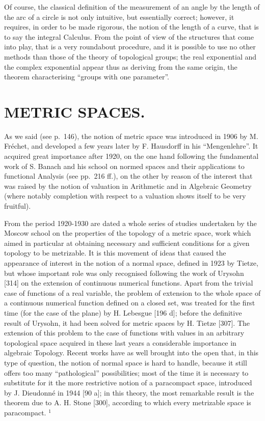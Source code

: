 Of course, the classical definition of the measurement of an angle by the length of the arc of a circle is not only intuitive, but essentially correct; however, it requires, in order to be made rigorous, the notion of the length of a curve, that is to say the integral Calculus. From the point of view of the structures that come into play, that is a very roundabout procedure, and it is possible to use no other methods than those of the theory of topological groups; the real exponential and the complex exponential appear thus as deriving from the same origin, the theorem characterising ``groups with one parameter''.

\chapter{METRIC SPACES.}

As we said (see p.~146), the notion of metric space was introduced in 1906 by M. Fréchet, and developed a few years later by F. Hausdorff in his ``Mengenlehre''. It acquired great importance after 1920, on the one hand following the fundamental work of S. Banach and his school on normed spaces and their applications to functional Analysis (see pp.~216 ff.), on the other by reason of the interest that was raised by the notion of valuation in Arithmetic and in Algebraic Geometry (where notably completion with respect to a valuation shows itself to be very fruitful).

From the period 1920-1930 are dated a whole series of studies undertaken by the Moscow school on the properties of the topology of a metric space, work which aimed in particular at obtaining necessary and sufficient conditions for a given topology to be metrizable. It is this movement of ideas that caused the appearance of interest in the notion of a normal space, defined in 1923 by Tietze, but whose important role was only recognised following the work of Urysohn {[}314{]} on the extension of continuous numerical functions. Apart from the trivial case of functions of a real variable, the problem of extension to the whole space of a continuous numerical function defined on a closed set, was treated for the first time (for the case of the plane) by H. Lebesgue {[}196 d{]}; before the definitive result of Urysohn, it had been solved for metric spaces by H. Tietze {[}307{]}. The extension of this problem to the case of functions with values in an arbitrary topological space acquired in these last years a considerable importance in algebraic Topology. Recent works have as well brought into the open that, in this type of question, the notion of normal space is hard to handle, because it still offers too many ``pathological'' possibilities; most of the time it is necessary to substitute for it the more restrictive notion of a paracompact space, introduced by J. Dieudonné in 1944 {[}90 a{]}; in this theory, the most remarkable result is the theorem due to A. H. Stone {[}300{]}, according to which every metrizable space is paracompact. \(^{1}\)

